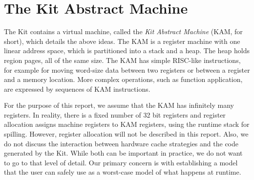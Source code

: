 \documentclass[12pt]{book}
\begin{document}
\section{The Kit Abstract Machine}
The Kit contains a virtual machine, called
the {\em Kit Abstract Machine} (KAM, for short), which details the
above ideas. The KAM is a register machine with one linear address
space, which is partitioned into a stack and a heap. The heap holds
region pages, all of the same size.  The KAM has simple RISC-like
instructions, for example for moving word-size data between two
registers or between a register and a memory location.  More complex
operations, such as function application, are expressed by sequences
of KAM instructions.

For the purpose of this report,
we assume that the KAM has infinitely many registers.
In reality, there is a fixed number of 32 bit registers and
register allocation assigns machine registers to KAM registers, using the runtime
stack for spilling. However, register allocation will not be described in this report.
Also, we do not discuss the interaction between hardware cache strategies and
the code generated by the Kit. While both can be important in practice, we do not want
to go to that level of detail. Our primary concern is with establishing a model that
the user can safely use as a worst-case model of what happens at runtime.
\end{document}
